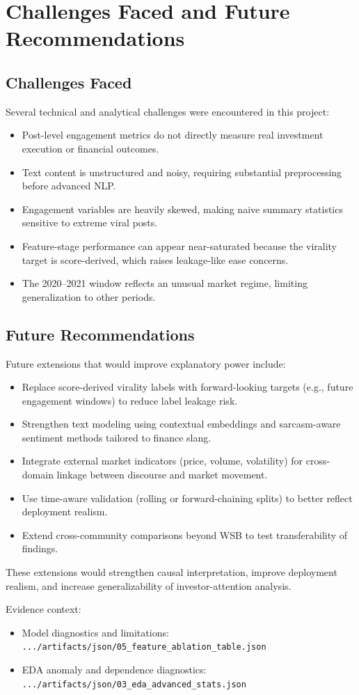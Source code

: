 \section{Challenges Faced and Future Recommendations}

\subsection{Challenges Faced}
Several technical and analytical challenges were encountered in this project:
\begin{itemize}
  \item Post-level engagement metrics do not directly measure real investment execution or financial outcomes.
  \item Text content is unstructured and noisy, requiring substantial preprocessing before advanced NLP.
  \item Engagement variables are heavily skewed, making naive summary statistics sensitive to extreme viral posts.
  \item Feature-stage performance can appear near-saturated because the virality target is score-derived, which raises leakage-like ease concerns.
  \item The 2020--2021 window reflects an unusual market regime, limiting generalization to other periods.
\end{itemize}

\subsection{Future Recommendations}
Future extensions that would improve explanatory power include:
\begin{itemize}
  \item Replace score-derived virality labels with forward-looking targets (e.g., future engagement windows) to reduce label leakage risk.
  \item Strengthen text modeling using contextual embeddings and sarcasm-aware sentiment methods tailored to finance slang.
  \item Integrate external market indicators (price, volume, volatility) for cross-domain linkage between discourse and market movement.
  \item Use time-aware validation (rolling or forward-chaining splits) to better reflect deployment realism.
  \item Extend cross-community comparisons beyond WSB to test transferability of findings.
\end{itemize}

These extensions would strengthen causal interpretation, improve deployment realism, and increase generalizability of investor-attention analysis.

Evidence context:
\begin{itemize}
  \item Model diagnostics and limitations: \verb|.../artifacts/json/05_feature_ablation_table.json|
  \item EDA anomaly and dependence diagnostics: \verb|.../artifacts/json/03_eda_advanced_stats.json|
\end{itemize}
